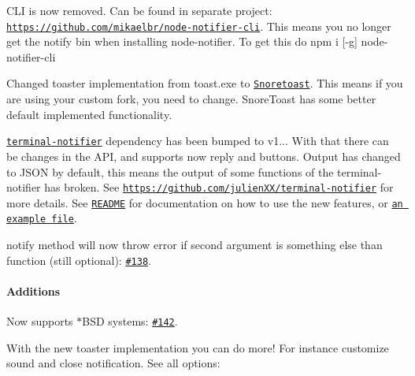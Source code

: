 \begin{DoxyEnumerate}
\item C\+LI is now removed. Can be found in separate project\+: \href{https://github.com/mikaelbr/node-notifier-cli}{\tt https\+://github.\+com/mikaelbr/node-\/notifier-\/cli}. This means you no longer get the {\ttfamily notify} bin when installing {\ttfamily node-\/notifier}. To get this do {\ttfamily npm i \mbox{[}-\/g\mbox{]} node-\/notifier-\/cli}
\item Changed toaster implementation from {\ttfamily toast.\+exe} to \href{https://github.com/KDE/snoretoast}{\tt Snoretoast}. This means if you are using your custom fork, you need to change. Snore\+Toast has some better default implemented functionality.
\item \href{https://github.com/julienXX/terminal-notifier}{\tt terminal-\/notifier} dependency has been bumped to {\ttfamily v1..}. With that there can be changes in the A\+PI, and supports now reply and buttons. Output has changed to J\+S\+ON by default, this means the output of some functions of the terminal-\/notifier has broken. See \href{https://github.com/julienXX/terminal-notifier}{\tt https\+://github.\+com/julien\+X\+X/terminal-\/notifier} for more details. See \href{https://github.com/mikaelbr/node-notifier#usage-notificationcenter}{\tt R\+E\+A\+D\+ME} for documentation on how to use the new features, or \href{https://github.com/mikaelbr/node-notifier/blob/master/example/macInput.js}{\tt an example file}.
\item {\ttfamily notify} method will now throw error if second argument is something else than function (still optional)\+: \href{https://github.com/mikaelbr/node-notifier/pull/138}{\tt \#138}.
\end{DoxyEnumerate}

\paragraph*{Additions}


\begin{DoxyEnumerate}
\item Now supports $\ast$\+B\+SD systems\+: \href{https://github.com/mikaelbr/node-notifier/pull/142}{\tt \#142}.
\item With the new toaster implementation you can do more! For instance customize sound and close notification. See all options\+:
\end{DoxyEnumerate}


